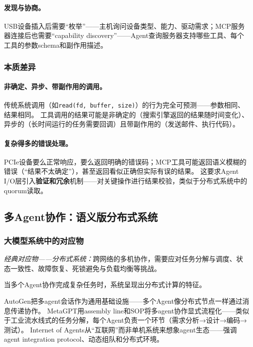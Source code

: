 \paragraph{发现与协商。}
USB设备插入后需要``枚举''——主机询问设备类型、能力、驱动需求；MCP服务器连接后也需要``capability discovery''——Agent查询服务器支持哪些工具、每个工具的参数schema和副作用描述。

\subsubsection{本质差异}

\paragraph{非确定、异步、带副作用的调用。}
传统系统调用（如\texttt{read(fd, buffer, size)}）的行为完全可预测——参数相同、结果相同。
工具调用的结果可能是非确定的（搜索引擎返回的结果随时间变化）、异步的（长时间运行的任务需要回调）且带副作用的（发送邮件、执行代码）。

\paragraph{复杂得多的错误处理。}
PCIe设备要么正常响应，要么返回明确的错误码；MCP工具可能返回语义模糊的错误（``结果不太确定''），甚至返回看似正确但实际有误的结果。
这要求Agent I/O层引入\textbf{验证和冗余}机制——对关键操作进行结果校验，类似于分布式系统中的quorum读取。

\subsection{多Agent协作：语义版分布式系统}
\label{sec:distributed}

\subsubsection{大模型系统中的对应物}

\textit{经典对应物——分布式系统：}跨网络的多机协作，需要应对任务分解与调度、状态一致性、故障恢复、死锁避免与负载均衡等挑战\cite{hennessy2017quantitative}。

当多个Agent协作完成复杂任务时，系统呈现出分布式计算的特征。

AutoGen把多agent会话作为通用基础设施\cite{wu2023autogen}——多个Agent像分布式节点一样通过消息传递协作。
MetaGPT用assembly line和SOP将多agent协作显式流程化\cite{metagpt2023}——类似于工业流水线式的任务分解，每个Agent负责一个环节（需求分析→设计→编码→测试）。
Internet of Agents从``互联网''而非单机系统来想象agent生态\cite{ioa2024}——强调agent integration protocol、动态组队和分布式环境。

